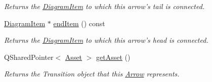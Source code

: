 \begin{DoxyCompactItemize}
\begin{DoxyCompactList}\small\item\em Returns the \hyperlink{class_diagram_item}{Diagram\-Item} to which this arrow's tail is connected. \end{DoxyCompactList}\item 
\hypertarget{class_arrow_a363d170cfcc7db0472843a93de7e86d4}{\hyperlink{class_diagram_item}{Diagram\-Item} $\ast$ \hyperlink{class_arrow_a363d170cfcc7db0472843a93de7e86d4}{end\-Item} () const }\label{class_arrow_a363d170cfcc7db0472843a93de7e86d4}

\begin{DoxyCompactList}\small\item\em Returns the \hyperlink{class_diagram_item}{Diagram\-Item} to which this arrow's head is connected. \end{DoxyCompactList}\item 
\hypertarget{class_arrow_a35c83e5bd91318017b1edb229b58df76}{Q\-Shared\-Pointer$<$ \hyperlink{class_picto_1_1_asset}{Asset} $>$ \hyperlink{class_arrow_a35c83e5bd91318017b1edb229b58df76}{get\-Asset} ()}\label{class_arrow_a35c83e5bd91318017b1edb229b58df76}

\begin{DoxyCompactList}\small\item\em Returns the Transition object that this \hyperlink{class_arrow}{Arrow} represents. \end{DoxyCompactList}\end{DoxyCompactItemize}
